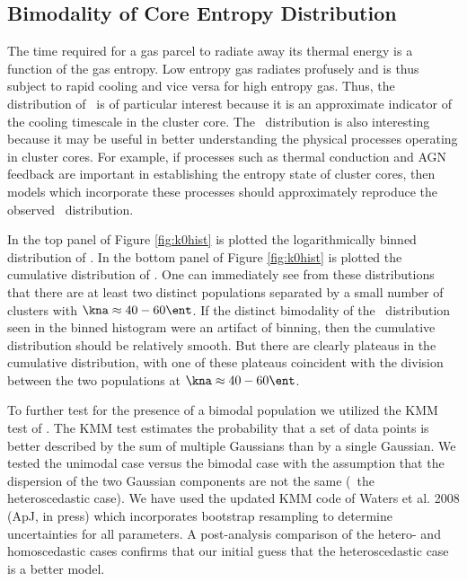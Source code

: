 \documentclass{emulateapj}
\begin{document}
\subsection{Bimodality of Core Entropy Distribution}
\label{sec:bimod}

The time required for a gas parcel to radiate away its thermal energy
is a function of the gas entropy. Low entropy gas radiates profusely
and is thus subject to rapid cooling and vice versa for high entropy
gas. Thus, the distribution of \kna\ is of particular interest because
it is an approximate indicator of the cooling timescale in the cluster
core. The \kna\ distribution is also interesting because it may be
useful in better understanding the physical processes operating in
cluster cores. For example, if processes such as thermal conduction
and AGN feedback are important in establishing the entropy state of
cluster cores, then models which incorporate these processes should
approximately reproduce the observed \kna\ distribution.

In the top panel of Figure \ref{fig:k0hist} is plotted the
logarithmically binned distribution of \kna. In the bottom panel of
Figure \ref{fig:k0hist} is plotted the cumulative distribution of
\kna. One can immediately see from these distributions that there are
at least two distinct populations separated by a small number of
clusters with $\kna \approx 40-60 \ent$. If the distinct bimodality of
the \kna\ distribution seen in the binned histogram were an artifact
of binning, then the cumulative distribution should be relatively
smooth. But there are clearly plateaus in the cumulative distribution,
with one of these plateaus coincident with the division between the
two populations at $\kna \approx 40-60 \ent$.

To further test for the presence of a bimodal population we utilized
the KMM test of \cite{1994AJ....108.2348A}. The KMM test estimates the
probability that a set of data points is better described by the sum
of multiple Gaussians than by a single Gaussian. We tested the
unimodal case versus the bimodal case with the assumption that the
dispersion of the two Gaussian components are not the same (\eg\ the
heteroscedastic case). We have used the updated KMM code of Waters et
al. 2008 (ApJ, in press) which incorporates bootstrap resampling to
determine uncertainties for all parameters. A post-analysis comparison
of the hetero- and homoscedastic cases confirms that our initial guess
that the heteroscedastic case is a better model.
\end{document}
